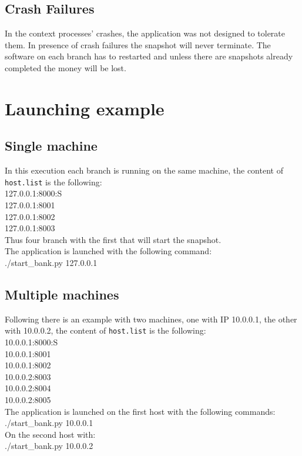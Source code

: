 \documentclass{article}
\begin{document}
    \subsection{Crash Failures}
        In the context processes’ crashes, the application was not designed to tolerate them.
        In presence of crash failures the snapshot will never terminate. The software on each branch has to restarted and unless there are snapshots already completed the money will be lost.

\section{Launching example}
        \subsection{Single machine}
        In this execution each branch is running on the same machine, the content of \texttt{host.list} is the following:\\
        127.0.0.1:8000:S\\
        127.0.0.1:8001\\
        127.0.0.1:8002\\
        127.0.0.1:8003\\
        Thus four branch with the first that will start the snapshot.\\
        The application is launched with the following command:\\
        ./start\_bank.py 127.0.0.1\\
        \subsection{Multiple machines}
        Following there is an example with two machines, one with IP 10.0.0.1, the other with 10.0.0.2, the content of \texttt{host.list} is the following:\\
        10.0.0.1:8000:S\\
        10.0.0.1:8001\\
        10.0.0.1:8002\\
        10.0.0.2:8003\\
        10.0.0.2:8004\\
        10.0.0.2:8005\\
        The application is launched on the first host with the following commands:\\
        ./start\_bank.py 10.0.0.1\\
        On the second host with:\\
        ./start\_bank.py 10.0.0.2
\end{document}
